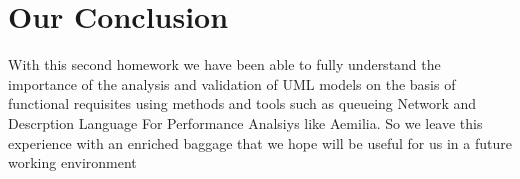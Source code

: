 \chapter{\textbf{Our Conclusion}}

With this second homework we have been able to fully understand the importance of the analysis and validation of UML models on the basis of functional requisites using methods and tools such as queueing Network and Descrption Language For Performance Analsiys like Aemilia.
So we leave this experience with an enriched baggage that we hope will be useful for us in a future working environment
